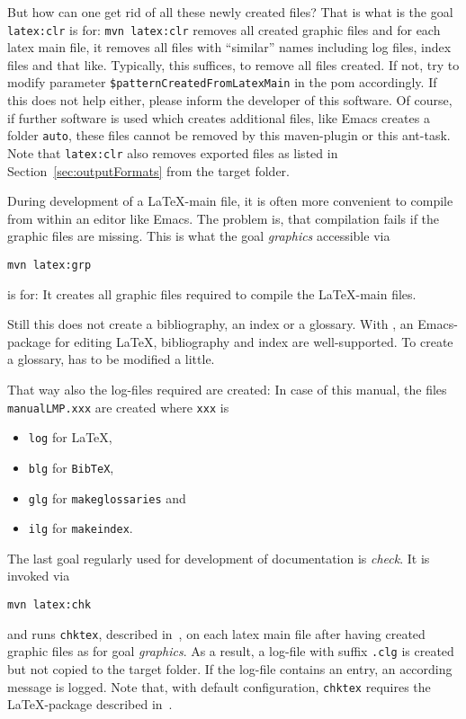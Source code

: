 But how can one get rid of all these newly created files? 
That is what is the goal \texttt{latex:clr} is for: 
% 
\texttt{mvn latex:clr}
%
removes all created graphic files 
and for each latex main file, it removes all files with ``similar'' names
including log files, index files and that like.
Typically, this suffices, to remove all files created. 
If not, 
try to modify parameter \texttt{\$patternCreatedFromLatexMain} 
in the pom accordingly. 
If this does not help either, please inform the developer of this software. 
Of course, if further software is used which creates additional files, 
like Emacs creates a folder \texttt{auto}, 
these files cannot be removed by this maven-plugin or this ant-task.
Note that \texttt{latex:clr}
also removes exported files as listed in Section~\ref{sec:outputFormats}
from the target folder. 

During development of a \LaTeX-main file, 
it is often more convenient to compile from within an editor like Emacs. 
The problem is, that compilation fails if the graphic files are missing. 
This is what the goal \emph{graphics} accessible via 
% 
\begin{Verbatim}
mvn latex:grp
\end{Verbatim}
%
is for: 
It creates all graphic files required to compile the \LaTeX-main files. 

Still this does not create a bibliography, an index or a glossary. 
With \auctex{}, an Emacs-package for editing \LaTeX, 
bibliography and index are well-supported. 
To create a glossary, \auctex{} has to be modified a little. 


That way also the log-files required are created: 
In case of this manual, 
the files \texttt{manualLMP.xxx} are created 
where \texttt{xxx} is 
%
\begin{itemize}
\item
\texttt{log} for \LaTeX, 
\item
\texttt{blg} for \texttt{BibTeX}, 
\item
\texttt{glg} for \texttt{makeglossaries} and 
\item
\texttt{ilg} for \texttt{makeindex}. 
\end{itemize}

The last goal regularly used for development of documentation is \emph{check}. 
It is invoked via 
% 
\begin{Verbatim}
mvn latex:chk
\end{Verbatim}
%
and runs \texttt{chktex}, described in~\cite{ChkTeX22}, 
on each latex main file 
after having created graphic files as for goal \emph{graphics}. 
As a result, a log-file with suffix \texttt{.clg} is created 
but not copied to the target folder. 
If the log-file contains an entry, 
an according message is logged. 
Note that, with default configuration, 
\texttt{chktex} requires the \LaTeX-package  
described in~\cite{BooktP}. 

